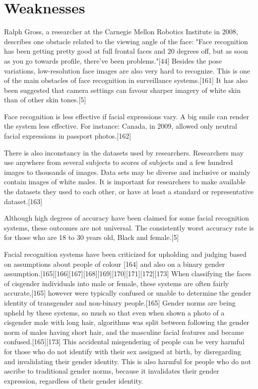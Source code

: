 \section{Weaknesses}
Ralph Gross, a researcher at the Carnegie Mellon Robotics Institute in 2008, describes one obstacle related to the viewing angle of the face: "Face recognition has been getting pretty good at full frontal faces and 20 degrees off, but as soon as you go towards profile, there've been problems."[44] Besides the pose variations, low-resolution face images are also very hard to recognize. This is one of the main obstacles of face recognition in surveillance systems.[161] It has also been suggested that camera settings can favour sharper imagery of white skin than of other skin tones.[5]

Face recognition is less effective if facial expressions vary. A big smile can render the system less effective. For instance: Canada, in 2009, allowed only neutral facial expressions in passport photos.[162]

There is also inconstancy in the datasets used by researchers. Researchers may use anywhere from several subjects to scores of subjects and a few hundred images to thousands of images. Data sets may be diverse and inclusive or mainly contain images of white males. It is important for researchers to make available the datasets they used to each other, or have at least a standard or representative dataset.[163]

Although high degrees of accuracy have been claimed for some facial recognition systems, these outcomes are not universal. The consistently worst accuracy rate is for those who are 18 to 30 years old, Black and female.[5]

Facial recognition systems have been criticized for upholding and judging based on assumptions about people of colour [164] and also on a binary gender assumption.[165][166][167][168][169][170][171][172][173] When classifying the faces of cisgender individuals into male or female, these systems are often fairly accurate,[165] however were typically confused or unable to determine the gender identity of transgender and non-binary people.[165] Gender norms are being upheld by these systems, so much so that even when shown a photo of a cisgender male with long hair, algorithms was split between following the gender norm of males having short hair, and the masculine facial features and became confused.[165][173] This accidental misgendering of people can be very harmful for those who do not identify with their sex assigned at birth, by disregarding and invalidating their gender identity. This is also harmful for people who do not ascribe to traditional gender norms, because it invalidates their gender expression, regardless of their gender identity.
\newpage
